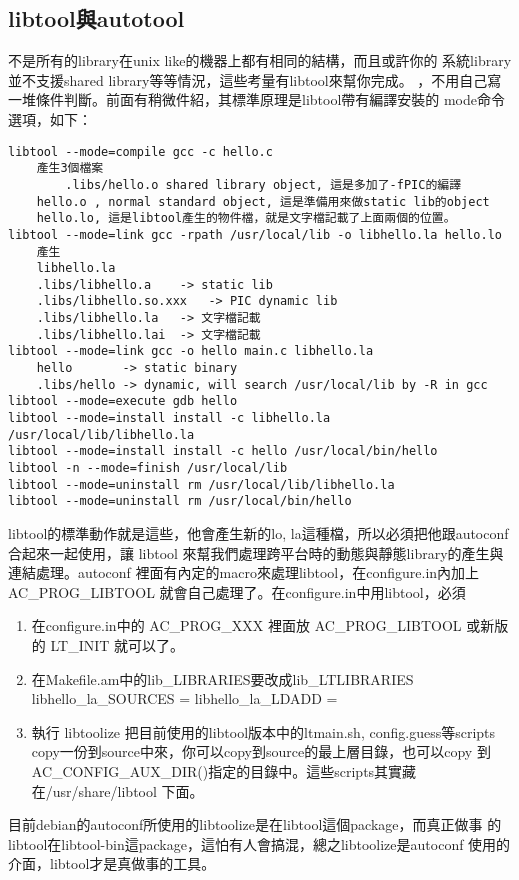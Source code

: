   \subsection{libtool與autotool}
  不是所有的library在unix like的機器上都有相同的結構，而且或許你的
  系統library並不支援shared library等等情況，這些考量有libtool來幫你完成。
  ，不用自己寫一堆條件判斷。前面有稍微件紹，其標準原理是libtool帶有編譯安裝的
  mode命令選項，如下：
  \begin{verbatim}
libtool --mode=compile gcc -c hello.c
	產生3個檔案
        .libs/hello.o shared library object, 這是多加了-fPIC的編譯
	hello.o , normal standard object, 這是準備用來做static lib的object
	hello.lo, 這是libtool產生的物件檔，就是文字檔記載了上面兩個的位置。
libtool --mode=link gcc -rpath /usr/local/lib -o libhello.la hello.lo
	產生
	libhello.la
	.libs/libhello.a	-> static lib
	.libs/libhello.so.xxx   -> PIC dynamic lib
	.libs/libhello.la	-> 文字檔記載
	.libs/libhello.lai	-> 文字檔記載
libtool --mode=link gcc -o hello main.c libhello.la
	hello		-> static binary
	.libs/hello	-> dynamic, will search /usr/local/lib by -R in gcc
libtool --mode=execute gdb hello
libtool --mode=install install -c libhello.la /usr/local/lib/libhello.la
libtool --mode=install install -c hello /usr/local/bin/hello
libtool -n --mode=finish /usr/local/lib
libtool --mode=uninstall rm /usr/local/lib/libhello.la
libtool --mode=uninstall rm /usr/local/bin/hello
  \end{verbatim}
  libtool的標準動作就是這些，他會產生新的lo, la這種檔，所以必須把他跟autoconf
  合起來一起使用，讓 libtool 來幫我們處理跨平台時的動態與靜態library的產生與
  連結處理。autoconf 裡面有內定的macro來處理libtool，在configure.in內加上
  AC\_PROG\_LIBTOOL 就會自己處理了。在configure.in中用libtool，必須
  \begin{enumerate}
    \item 在configure.in中的 AC\_PROG\_XXX 裡面放 AC\_PROG\_LIBTOOL 或新版的 LT\_INIT
      就可以了。
    \item 在Makefile.am中的lib\_LIBRARIES要改成lib\_LTLIBRARIES
         libhello\_la\_SOURCES =
         libhello\_la\_LDADD =
    \item 執行 libtoolize
      把目前使用的libtool版本中的ltmain.sh, config.guess等scripts
      copy一份到source中來，你可以copy到source的最上層目錄，也可以copy
      到AC\_CONFIG\_AUX\_DIR()指定的目錄中。這些scripts其實藏在/usr/share/libtool
      下面。
  \end{enumerate}
  目前debian的autoconf所使用的libtoolize是在libtool這個package，而真正做事
  的libtool在libtool-bin這package，這怕有人會搞混，總之libtoolize是autoconf
  使用的介面，libtool才是真做事的工具。

